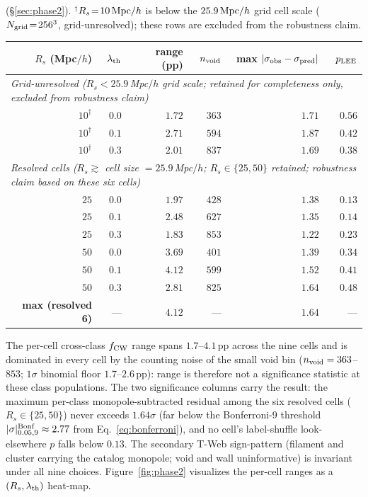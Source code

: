 \documentclass[aps,prd,twocolumn,superscriptaddress,showpacs,preprintnumbers,nofootinbib,longbibliography,floatfix]{revtex4-2}
\begin{document}
\begin{table}[!tp]
{(\S\ref{sec:phase2}). $^\dagger$$R_s\!=\!10\,{\rm Mpc}/h$ is below the
$25.9\,{\rm Mpc}/h$ grid cell scale ($N_{\rm grid}\!=\!256^3$, grid-unresolved);
these rows are excluded from the robustness claim.}
\label{tab:phase2}
\begin{ruledtabular}
\begin{tabular}{rrrrrr}
$R_s$ (Mpc$/h$) & $\lambda_{\rm th}$ & range (pp) & $n_{\rm void}$ &
max $|\sigma_{\rm obs}-\sigma_{\rm pred}|$ & $p_{\rm LEE}$ \\
\hline
\multicolumn{6}{l}{\textit{Grid-unresolved ($R_s < 25.9$\,Mpc$/h$ grid scale; retained for completeness only, excluded from robustness claim)}} \\
$10^\dagger$ & $0.0$ & $1.72$ & $363$ & $1.71$ & $0.56$ \\
$10^\dagger$ & $0.1$ & $2.71$ & $594$ & $1.87$ & $0.42$ \\
$10^\dagger$ & $0.3$ & $2.01$ & $837$ & $1.69$ & $0.38$ \\
\hline
\multicolumn{6}{l}{\textit{Resolved cells ($R_s \gtrsim$ cell size $= 25.9$\,Mpc$/h$; $R_s \in \{25, 50\}$ retained; robustness claim based on these six cells)}} \\
$25$ & $0.0$ & $1.97$ & $428$ & $1.38$ & $0.13$ \\
$25$ & $0.1$ & $2.48$ & $627$ & $1.35$ & $0.14$ \\
$25$ & $0.3$ & $1.83$ & $853$ & $1.22$ & $0.23$ \\
$50$ & $0.0$ & $3.69$ & $401$ & $1.39$ & $0.34$ \\
$50$ & $0.1$ & $4.12$ & $599$ & $1.52$ & $0.41$ \\
$50$ & $0.3$ & $2.81$ & $825$ & $1.64$ & $0.48$ \\
\hline
\textbf{max (resolved 6)} & --- & $\mathbf{4.12}$ & --- &
$\mathbf{1.64}$ & --- \\
\end{tabular}
\end{ruledtabular}
\end{table}

The per-cell cross-class $f_{\rm CW}$ range spans $1.7$--$4.1$\,pp
across the nine cells and is dominated in every cell by the
counting noise of the small void bin ($n_{\rm void} = 363$--$853$;
$1\sigma$ binomial floor $1.7$--$2.6$\,pp): range is therefore not a
significance statistic at these class populations. The two
significance columns carry the result: the maximum per-class
monopole-subtracted residual among the six resolved cells ($R_s \in
\{25, 50\}$) never exceeds $1.64\sigma$ (far below the
Bonferroni-9 threshold $|\sigma|^{\rm Bonf}_{0.05,9} \approx 2.77$
from Eq.~\eqref{eq:bonferroni}),
and no cell's label-shuffle look-elsewhere $p$ falls below $0.13$.
The secondary T-Web sign-pattern (filament and
cluster carrying the catalog monopole; void and wall uninformative) is
invariant under all nine choices. Figure~\ref{fig:phase2} visualizes
the per-cell ranges as a $(R_s, \lambda_{\rm th})$ heat-map.
\end{document}
